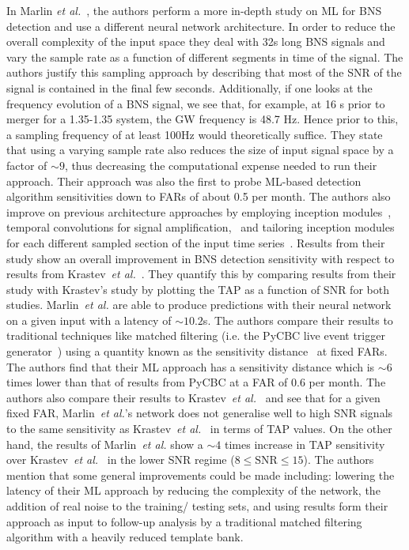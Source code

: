 %
In Marlin \textit{et al.}~\cite{PhysRevD.102.063015}, 
the authors perform a more 
in-depth study on \ac{ML} for \ac{BNS} detection and use a different 
neural network architecture. In order to 
reduce the overall complexity of the input space they deal with 
32s long \ac{BNS} signals and vary the sample rate as a function of 
different segments in time of the signal. The authors justify this 
sampling approach by describing that most of the \ac{SNR} of the 
signal is contained in the final few seconds. Additionally, if one 
looks at the frequency evolution of a \ac{BNS} signal, we see that, for example,
at 16 s prior to merger for a 1.35-1.35 system, the GW frequency is 
48.7 Hz. Hence prior to this, a sampling frequency of at least 
100Hz would theoretically suffice. They state that using a 
varying sample rate also 
reduces the size of input signal space by a factor of $\sim 9$, thus 
decreasing the computational expense needed to run their 
approach. Their approach was also the first to probe \ac{ML}-based 
detection algorithm sensitivities down to \ac{FAR}s of about 0.5 per month. 
The authors also improve on previous architecture approaches by employing 
inception modules~\cite{1409.4842}, temporal convolutions for signal
amplification,~\cite{inproceedings_temporal} and tailoring 
inception modules for each different sampled section of 
the input time series~\cite{PhysRevD.102.063015}. Results from 
their study show an overall improvement in \ac{BNS} detection sensitivity 
with respect to results from Krastev~\textit{et al.}~\cite{KRASTEV2020135330}.
They quantify this by comparing results from their study with 
Krastev's study by plotting the \ac{TAP} as a function 
of \ac{SNR} for both studies. Marlin~\textit{et al.} are able to 
produce predictions with their neural network on a given input with a 
latency of $\sim10.2$s. The authors compare their results to 
traditional techniques like matched filtering 
(i.e. the PyCBC live event trigger 
generator~\cite{0264-9381-33-21-215004}) using a quantity known 
as the sensitivity distance~\cite{PhysRevD.102.063015} at fixed 
\ac{FAR}s. The authors find that their \ac{ML} approach has 
a sensitivity distance 
which is $\sim 6$ times lower than that of results from 
PyCBC at a \ac{FAR} of 0.6 per month. The authors also 
compare their results to Krastev~\textit{et al.}~\cite{KRASTEV2020135330} 
and see that for a given fixed \ac{FAR}, Marlin~\textit{et al.}'s 
network does not generalise well to high \ac{SNR} signals to the 
same sensitivity as Krastev~\textit{et al.}~\cite{KRASTEV2020135330} 
in terms of \ac{TAP} values. On the other hand, the results of 
Marlin~\textit{et al.} show a $\sim 4$ times increase in 
\ac{TAP} sensitivity 
over Krastev~\textit{et al.}~\cite{KRASTEV2020135330} in the lower 
\ac{SNR} regime ($8 \leq \mathrm{SNR} \leq 15$).
The authors mention that some general improvements 
could be made including: lowering the latency of their \ac{ML} 
approach by reducing 
the complexity of the network, the addition of real noise to the training/
testing sets, and using results form their approach as input 
to follow-up analysis by a traditional matched filtering algorithm with 
a heavily reduced template bank.

